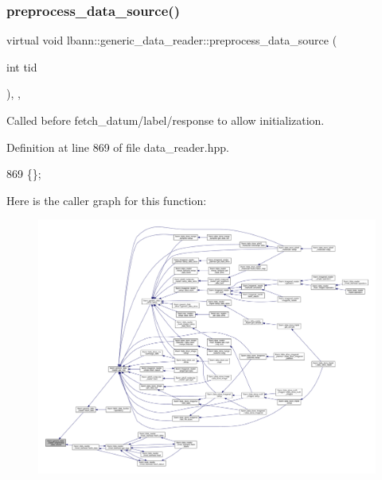 \subsubsection{\texorpdfstring{preprocess\+\_\+data\+\_\+source()}{preprocess\_data\_source()}}
{\footnotesize\ttfamily virtual void lbann\+::generic\+\_\+data\+\_\+reader\+::preprocess\+\_\+data\+\_\+source (\begin{DoxyParamCaption}\item[{int}]{tid }\end{DoxyParamCaption})\hspace{0.3cm}{\ttfamily [inline]}, {\ttfamily [protected]}, {\ttfamily [virtual]}}

Called before fetch\+\_\+datum/label/response to allow initialization. 

Definition at line 869 of file data\+\_\+reader.\+hpp.


\begin{DoxyCode}
869 \{\};
\end{DoxyCode}
Here is the caller graph for this function\+:\nopagebreak
\begin{figure}[H]
\begin{center}
\leavevmode
\includegraphics[width=350pt]{classlbann_1_1generic__data__reader_ad613f95666b973d8da77773fb34c9b66_icgraph}
\end{center}
\end{figure}
\mbox{\label{classlbann_1_1generic__data__reader_a8cf298061c73f55e2fe717acd2a9f178}} 
